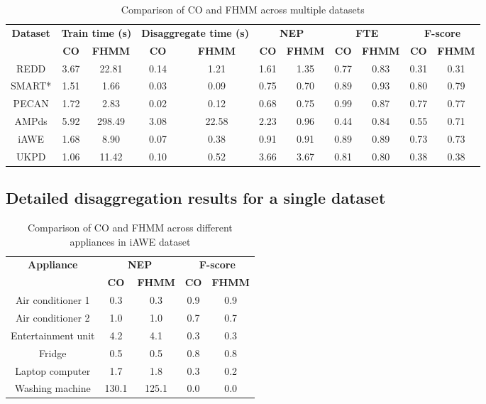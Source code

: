 \documentclass{sig-alternate}
\begin{document}
\begin{table}
\centering
\begin{tabular}{ccccccccccc}
\hline\textbf{Dataset} & \multicolumn{2}{c}{\textbf{Train time (s)}}& \multicolumn{2}{c}{\textbf{Disaggregate time (s)}} &\multicolumn{2}{c}{\textbf{NEP}}    & \multicolumn{2}{c}{\textbf{FTE}} &\multicolumn{2}{c}{\textbf{F-score}} \\ 
~ &\textbf{CO} & \textbf{FHMM} &\textbf{CO} & \textbf{FHMM} &\textbf{CO} & \textbf{FHMM} &\textbf{CO} & \textbf{FHMM}&\textbf{CO} & \textbf{FHMM} \\ \hline 
REDD &3.67 &22.81 &0.14 &1.21 &1.61 &1.35 &0.77 &0.83 &0.31 &0.31\\ 
SMART* &1.51 &1.66 &0.03 &0.09 &0.75 &0.70 &0.89 &0.93 &0.80 &0.79\\ 
PECAN &1.72 &2.83 &0.02 &0.12 &0.68 &0.75 &0.99 &0.87 &0.77 &0.77\\ 
AMPds &5.92 &298.49 &3.08 &22.58 &2.23 &0.96 &0.44 &0.84 &0.55 &0.71\\ 
iAWE &1.68 &8.90 &0.07 &0.38 &0.91 &0.91 &0.89 &0.89 &0.73 &0.73\\ 
UKPD &1.06 &11.42 &0.10 &0.52 &3.66 &3.67 &0.81 &0.80 &0.38 &0.38\\
\hline
\end{tabular}
\caption{Comparison of CO and FHMM across multiple datasets}
\label{table:disaggregation}
\end{table}

\subsection{Detailed disaggregation results for a single dataset}


\begin{table}
    \begin{tabular}{ccccc}
    \hline \textbf{Appliance} & \multicolumn{2}{c}{\textbf{NEP}} & \multicolumn{2}{c}{\textbf{F-score}}\\
    ~                  & \textbf{CO}    & \textbf{FHMM}  & \textbf{CO}      & \textbf{FHMM} \\ \hline
    Air conditioner 1  & 0.3   & 0.3   & 0.9     & 0.9  \\
    Air conditioner 2  & 1.0   & 1.0   & 0.7     & 0.7  \\
    Entertainment unit & 4.2   & 4.1   & 0.3     & 0.3  \\
    Fridge             & 0.5   & 0.5   & 0.8     & 0.8  \\
    Laptop computer    & 1.7   & 1.8   & 0.3     & 0.2  \\
    Washing machine    & 130.1 & 125.1 & 0.0     & 0.0  \\
    \hline \end{tabular}
    \caption{Comparison of CO and FHMM across different appliances in iAWE dataset}
\label{table:disaggregation_iawe}
\end{table}
\end{document}

